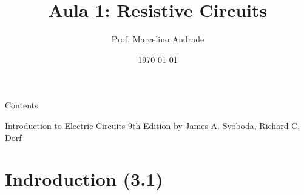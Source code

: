 \documentclass[aspectratio=169]{beamer}
\title[\sc{Teoria de Circuitos Eletrônicos 1}]{\LARGE Aula 1: Resistive Circuits}
\author[Prof. Marcelino Andrade]{Prof. Marcelino Andrade}
\institute{Faculdade UnB Gama} %
\date{\today}
\begin{document}
\justifying %
\pagebreak

\begin{frame}
  \titlepage
\end{frame}


\begin{frame}{Contents}
\tableofcontents
\begin{center}	
     		Introduction to Electric Circuits 9th Edition by James A. Svoboda, Richard C. Dorf			
\end{center}	
\end{frame}

\section{Indroduction (3.1)}
\end{document}
